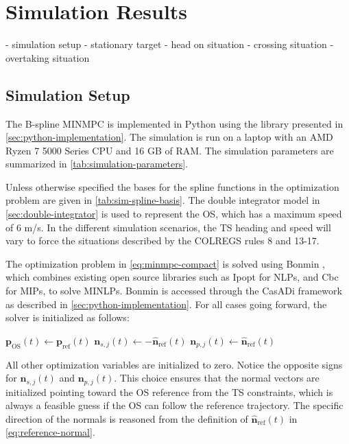 
\chapter{Simulation Results}\label{chap:simulation-results}

- simulation setup
- stationary target
- head on situation
- crossing situation
- overtaking situation

\section{Simulation Setup}\label{sec:simulation-setup}

The B-spline MINMPC is implemented in Python using the library presented in \cref{sec:python-implementation}. The simulation is run on a laptop with an AMD Ryzen 7 5000 Series CPU and 16 GB of RAM. The simulation parameters are summarized in \cref{tab:simulation-parameters}. 

Unless otherwise specified the bases for the spline functions in the optimization problem are given in \cref{tab:sim-spline-basis}.
The double integrator model in \cref{sec:double-integrator} is used to represent the OS, which has a maximum speed of 6 m/s. In the different simulation scenarios, the TS heading and speed will vary to force the situations described by the COLREGS rules 8 and 13-17.

The optimization problem in \cref{eq:minmpc-compact} is solved using Bonmin \citep{bonmin2008}, which combines existing open source libraries such as Ipopt \citep{ipopt2006} for NLPs, and Cbc \citep{cbc2005} for MIPs, to solve MINLPs. Bonmin is accessed through the CasADi framework as described in \cref{sec:python-implementation}. 
For all cases going forward, the solver is initialized as follows:
\begin{algorithmic}
    \centering
    \State $\mathbf p_\text{OS}(t) \gets \mathbf p_\text{ref}(t)$
        \State $\mathbf n_{s,j}(t) \gets -\mathbf{\hat n}_\text{ref}(t)$
        \State $\mathbf n_{p,j}(t) \gets \mathbf{\hat n}_\text{ref}(t)$
    \EndFor
\end{algorithmic}
All other optimization variables are initialized to zero. Notice the opposite signs for $\mathbf n_{s,j}(t)$ and $\mathbf n_{p,j}(t)$.
This choice ensures that the normal vectors are initialized pointing toward the OS reference from the TS constraints, which is always a feasible guess if the OS can follow the reference trajectory. 
The specific direction of the normals is reasoned from the definition of $\mathbf{\hat n}_\text{ref}(t)$ in \cref{eq:reference-normal}.

